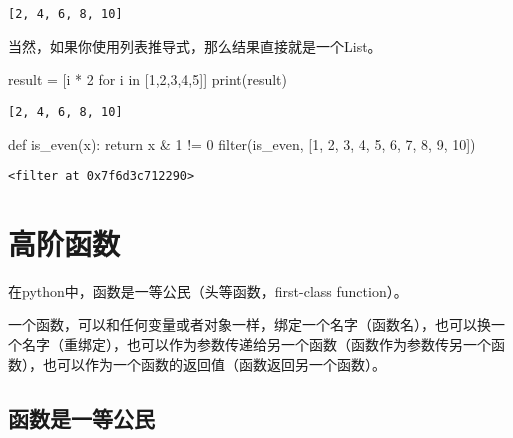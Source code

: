\documentclass[
  letterpaper,
  DIV=11,
  numbers=noendperiod]{scrreprt}
\newenvironment{Shaded}{\begin{snugshade}}{\end{snugshade}}
\newcommand{\BuiltInTok}[1]{\textcolor[rgb]{0.00,0.23,0.31}{#1}}
\newcommand{\ControlFlowTok}[1]{\textcolor[rgb]{0.00,0.23,0.31}{#1}}
\newcommand{\DecValTok}[1]{\textcolor[rgb]{0.68,0.00,0.00}{#1}}
\newcommand{\KeywordTok}[1]{\textcolor[rgb]{0.00,0.23,0.31}{#1}}
\newcommand{\NormalTok}[1]{\textcolor[rgb]{0.00,0.23,0.31}{#1}}
\newcommand{\OperatorTok}[1]{\textcolor[rgb]{0.37,0.37,0.37}{#1}}
\begin{document}
\begin{verbatim}
[2, 4, 6, 8, 10]
\end{verbatim}

当然，如果你使用列表推导式，那么结果直接就是一个List。

\begin{Shaded}
\begin{Highlighting}[]
\NormalTok{result }\OperatorTok{=}\NormalTok{ [i }\OperatorTok{*} \DecValTok{2} \ControlFlowTok{for}\NormalTok{ i }\KeywordTok{in}\NormalTok{ [}\DecValTok{1}\NormalTok{,}\DecValTok{2}\NormalTok{,}\DecValTok{3}\NormalTok{,}\DecValTok{4}\NormalTok{,}\DecValTok{5}\NormalTok{]]}
\BuiltInTok{print}\NormalTok{(result)}
\end{Highlighting}
\end{Shaded}

\begin{verbatim}
[2, 4, 6, 8, 10]
\end{verbatim}

\begin{Shaded}
\begin{Highlighting}[]
\KeywordTok{def}\NormalTok{ is\_even(x):}
    \ControlFlowTok{return}\NormalTok{ x }\OperatorTok{\&} \DecValTok{1} \OperatorTok{!=} \DecValTok{0}
\BuiltInTok{filter}\NormalTok{(is\_even, [}\DecValTok{1}\NormalTok{, }\DecValTok{2}\NormalTok{, }\DecValTok{3}\NormalTok{, }\DecValTok{4}\NormalTok{, }\DecValTok{5}\NormalTok{, }\DecValTok{6}\NormalTok{, }\DecValTok{7}\NormalTok{, }\DecValTok{8}\NormalTok{, }\DecValTok{9}\NormalTok{, }\DecValTok{10}\NormalTok{])}
\end{Highlighting}
\end{Shaded}

\begin{verbatim}
<filter at 0x7f6d3c712290>
\end{verbatim}

\hypertarget{ux9ad8ux9636ux51fdux6570}{%
\section{高阶函数}\label{ux9ad8ux9636ux51fdux6570}}

在python中，函数是一等公民（头等函数，first-class function）。

一个函数，可以和任何变量或者对象一样，绑定一个名字（函数名），也可以换一个名字（重绑定），也可以作为参数传递给另一个函数（函数作为参数传另一个函数），也可以作为一个函数的返回值（函数返回另一个函数）。

\hypertarget{ux51fdux6570ux662fux4e00ux7b49ux516cux6c11}{%
\subsection{函数是一等公民}\label{ux51fdux6570ux662fux4e00ux7b49ux516cux6c11}}
\end{document}
